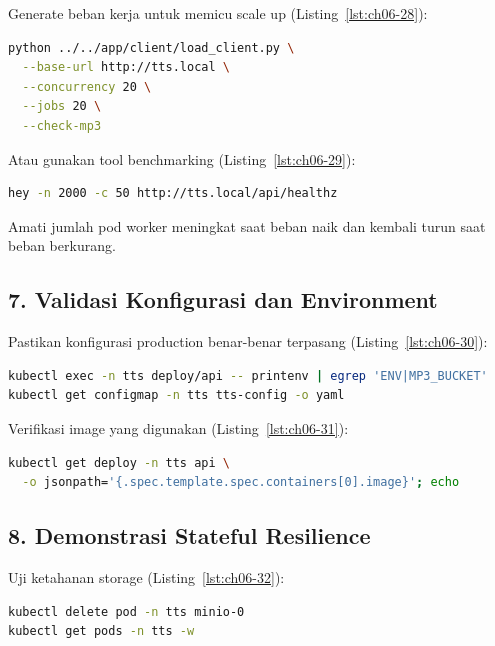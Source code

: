 Generate beban kerja untuk memicu scale up (Listing~\ref{lst:ch06-28}):

\begin{lstlisting}[language=bash, caption={Perintah python ../../app/client/load\_client.py /}, label={lst:ch06-28}]
python ../../app/client/load_client.py \
  --base-url http://tts.local \
  --concurrency 20 \
  --jobs 20 \
  --check-mp3
\end{lstlisting}

Atau gunakan tool benchmarking (Listing~\ref{lst:ch06-29}):

\begin{lstlisting}[language=bash, caption={Perintah hey -n 2000 -c 50 http://tts.local/api/healthz}, label={lst:ch06-29}]
hey -n 2000 -c 50 http://tts.local/api/healthz
\end{lstlisting}

Amati jumlah pod worker meningkat saat beban naik dan kembali turun saat beban berkurang.

\subsection*{7. Validasi Konfigurasi dan Environment}

Pastikan konfigurasi production benar-benar terpasang (Listing~\ref{lst:ch06-30}):

\begin{lstlisting}[language=bash, caption={Menelusuri pod Kubernetes}, label={lst:ch06-30}]
kubectl exec -n tts deploy/api -- printenv | egrep 'ENV|MP3_BUCKET'
kubectl get configmap -n tts tts-config -o yaml
\end{lstlisting}

Verifikasi image yang digunakan (Listing~\ref{lst:ch06-31}):

\begin{lstlisting}[language=bash, caption={Memeriksa objek Kubernetes (4)}, label={lst:ch06-31}]
kubectl get deploy -n tts api \
  -o jsonpath='{.spec.template.spec.containers[0].image}'; echo
\end{lstlisting}

\subsection*{8. Demonstrasi Stateful Resilience}

Uji ketahanan storage (Listing~\ref{lst:ch06-32}):

\begin{lstlisting}[language=bash, caption={Mengubah objek Kubernetes (2)}, label={lst:ch06-32}]
kubectl delete pod -n tts minio-0
kubectl get pods -n tts -w
\end{lstlisting}

